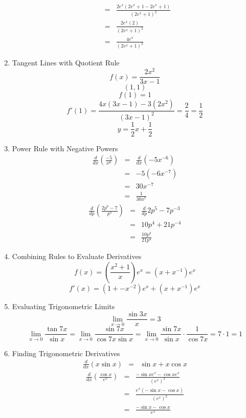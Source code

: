 \documentclass{article}
\begin{document}
\begin{enumerate}
\begin{eqnarray}
        &=& \frac{2e^x(2e^x + 1 - 2e^x + 1)}{(2e^x + 1)^2} \\
        &=& \frac{2e^x(2)}{(2e^x + 1)^2} \\
        &=& \frac{4e^x}{(2e^x + 1)^2}
    \end{eqnarray}
    \item Tangent Lines with Quotient Rule
    $$f(x) = \frac{2x^2}{3x - 1}$$
    $$(1, 1)$$
    $$f(1) = 1$$
    $$f'(1) = \frac{4x(3x - 1) - 3(2x^2)}{(3x - 1)^2} = \frac{2}{4} = \frac{1}{2}$$
    $$y = \frac{1}{2}x + \frac{1}{2}$$
    \item Power Rule with Negative Powers
    \begin{eqnarray}
        \frac{d}{dx}\left(\frac{-5}{x^6}\right) &=& \frac{d}{dx}\left(-5x^{-6}\right) \\
        &=& -5\left(-6x^{-7}\right) \\
        &=& 30x^{-7} \\
        &=& \frac{1}{30x^{7}}
    \end{eqnarray}
    \begin{eqnarray}
    \frac{d}{dp}\left(\frac{2p^8 - 7}{p^3}\right) &=& \frac{d}{dp}2p^5 - 7p^{-3} \\
    &=& 10p^4 + 21p^{-4} \\
    &=& \frac{10p^4}{21p^4}
    \end{eqnarray}
    \item Combining Rules to Evaluate Derivatives
        $$f(x) = \left(\frac{x^2 + 1}{x}\right)e^x = \left(x + x^{-1}\right)e^x$$
        $$f'(x) = \left(1 + -x^{-2}\right)e^x + \left(x + x^{-1}\right)e^x$$
    \item Evaluating Trigonometric Limits
    $$\lim_{x \to 0}{\frac{\sin{3x}}{x}} = 3$$
    $$\lim_{x \to 0}{\frac{\tan{7x}}{\sin{x}}} = \lim_{x \to 0}{\frac{\sin{7x}}{\cos{7x}\sin{x}}} = \lim_{x \to 0}{\frac{\sin{7x}}{\sin{x}} \cdot \frac{1}{\cos{7x}}} = 7 \cdot 1 = 1$$
    \item Finding Trigonometric Derivatives
    \begin{eqnarray}
        \frac{d}{dx}\left(x\sin{x}\right) &=& \sin{x} + x\cos{x}
    \end{eqnarray}
    \begin{eqnarray}
        \frac{d}{dx}\left(\frac{\cos{x}}{e^x}\right) &=& \frac{-\sin{x}e^x - \cos{x}e^x}{\left(e^x\right)^2} \\
        &=& \frac{e^x (-\sin{x} - \cos{x})}{\left(e^x\right)^2} \\
        &=& \frac{-\sin{x} - \cos{x}}{e^x} \\

\end{eqnarray}
\end{enumerate}
\end{document}
